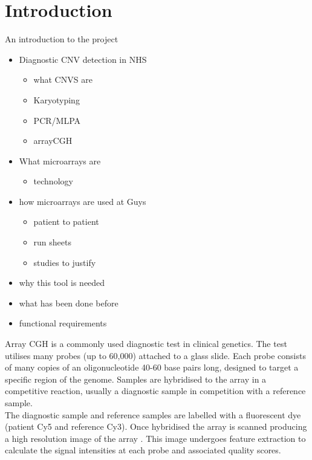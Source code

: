 
\chapter{Introduction}\label{ch:introduction}
An introduction to the project
\begin{itemize}
  \item Diagnostic CNV detection in NHS
  	\begin{itemize}
    \item what CNVS are
    \item Karyotyping
    \item PCR/MLPA
    \item arrayCGH
    \end{itemize}
  \item What microarrays are
  	\begin{itemize}
    \item technology 
	\end{itemize} 
  \item how microarrays are used at Guys
  	\begin{itemize}
    \item patient to patient
    \item run sheets
    \item studies to justify
    \end{itemize}
  \item why this tool is needed
  \item what has been done before
  \item functional requirements 
	
\end{itemize}


Array \ac{CGH} is a commonly used diagnostic test in clinical genetics. The test utilises many probes (up to 60,000) attached to a glass slide.
Each probe consists of many copies of an oligonucleotide 40-60 base pairs long, designed to target a specific region of the genome. 
Samples are hybridised to the array in a competitive reaction, usually a diagnostic sample in competition with a reference sample. \\

The diagnostic sample and reference samples are labelled with a fluorescent dye (patient Cy5 and reference Cy3). 
Once hybridised the array is scanned producing a high resolution image of the
array \citep{ahn2010}.
This image undergoes feature extraction to calculate the signal intensities at each probe and associated quality scores.\\


